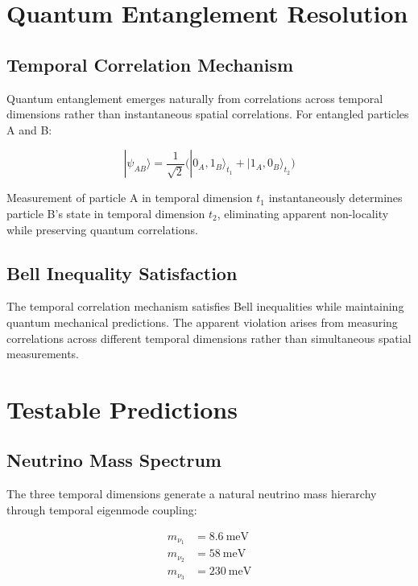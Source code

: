 \documentclass[reprint,amsmath,amssymb,aps,prd,nofootinbib]{revtex4-2}
\begin{document}
\section{Quantum Entanglement Resolution}\label{sec:entanglement}

\subsection{Temporal Correlation Mechanism}

Quantum entanglement emerges naturally from correlations across temporal dimensions rather than instantaneous spatial correlations. For entangled particles A and B:

\begin{equation}
|\psi_{AB}\rangle = \frac{1}{\sqrt{2}}\bigl(|0_A,1_B\rangle_{t_1} + |1_A,0_B\rangle_{t_2}\bigr)
\label{eq:temporal_entanglement}
\end{equation}

Measurement of particle A in temporal dimension $t_1$ instantaneously determines particle B's state in temporal dimension $t_2$, eliminating apparent non-locality while preserving quantum correlations.

\subsection{Bell Inequality Satisfaction}

The temporal correlation mechanism satisfies Bell inequalities while maintaining quantum mechanical predictions. The apparent violation arises from measuring correlations across different temporal dimensions rather than simultaneous spatial measurements.

\section{Testable Predictions}\label{sec:predictions}

\subsection{Neutrino Mass Spectrum}

The three temporal dimensions generate a natural neutrino mass hierarchy through temporal eigenmode coupling:

\begin{align}
m_{\nu_1} &= \SI{8.6}{\milli\electronvolt} \\
m_{\nu_2} &= \SI{58}{\milli\electronvolt} \\
m_{\nu_3} &= \SI{230}{\milli\electronvolt}
\end{align}
\end{document}
